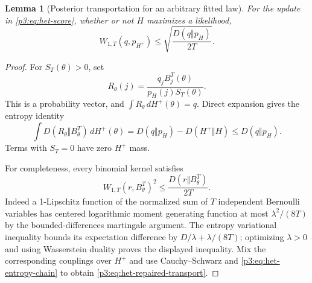 \documentclass[11pt,a4paper]{article}
\newtheorem{lemma}[theorem]{Lemma}
\theoremstyle{definition}
\theoremstyle{remark}
\numberwithin{equation}{section}
\begin{document}
\begin{lemma}[Posterior transportation for an arbitrary fitted law]
\label{p3:lem:het-transport}
For the update in \eqref{p3:eq:het-score}, whether or not $H$ maximizes a
likelihood,
\begin{equation}\label{p3:eq:het-repaired-transport}
 W_{1,T}(q,p_{H^+})
       \le\sqrt{\frac{D(q\Vert p_H)}{2T}}.
\end{equation}
\end{lemma}
\begin{proof}
For $S_T(\theta)>0$, set
\[
 R_\theta(j)=\frac{q_jB_j^T(\theta)}{p_H(j)S_T(\theta)}.
\]
This is a probability vector, and $\int R_\theta\,dH^+(\theta)=q$.
Direct expansion gives the entropy identity
\begin{equation}\label{p3:eq:het-entropy-chain}
 \int D(R_\theta\Vert B^T_\theta)\,dH^+(\theta)
   =D(q\Vert p_H)-D(H^+\Vert H)
   \le D(q\Vert p_H).
\end{equation}
Terms with $S_T=0$ have zero $H^+$ mass.

For completeness, every binomial kernel satisfies
\[
 W_{1,T}(r,B^T_\theta)^2\le\frac{D(r\Vert B^T_\theta)}{2T}.
\]
Indeed a 1-Lipschitz function of the normalized sum of $T$ independent
Bernoulli variables has centered logarithmic moment generating function
at most $\lambda^2/(8T)$ by the bounded-differences martingale argument.
The entropy variational inequality bounds its expectation difference by
$D/\lambda+\lambda/(8T)$; optimizing $\lambda>0$ and using Wasserstein
duality proves the displayed inequality.  Mix the corresponding couplings
over $H^+$ and use Cauchy--Schwarz and \eqref{p3:eq:het-entropy-chain} to
obtain \eqref{p3:eq:het-repaired-transport}.
\end{proof}
\end{document}
